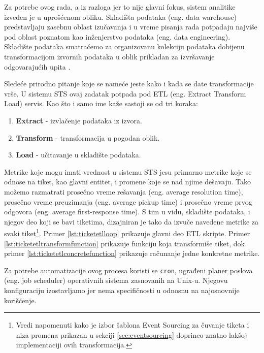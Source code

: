 \documentclass[12pt,oneside]{memoir}
\begin{document}
Za potrebe ovog rada, a iz razloga jer to nije glavni fokus, sistem analitike izveden je u uprošćenom obliku. Skladišta podataka (eng. data warehouse) predstavljaju zasebnu oblast izučavanja i u vreme pisanja rada potpadaju najviše pod oblast poznatom kao inženjerstvo podataka (eng. data engineering). Skladište podataka smatraćemo za organizovanu kolekciju podataka dobijenu transformacijom izvornih podataka u oblik prikladan za izvršavanje odgovarajućih upita \cite{dataanalytics}.

Sledeće prirodno pitanje koje se nameće jeste kako i kada se date transformacije vrše. U sistemu STS ovaj zadatak potpada pod ETL (eng. Extract Transform Load) servis. Kao što i samo ime kaže sastoji se od tri koraka:
\begin{enumerate}
    \item \textbf{Extract} - izvlačenje podataka iz izvora.
    \item \textbf{Transform} - transformacija u pogodan oblik.
    \item \textbf{Load} - učitavanje u skladište podataka.
\end{enumerate}

Metrike koje mogu imati vrednost u sistemu STS jesu primarno metrike koje se odnose na tiket, kao glavni entitet, i promene koje se nad njime dešavaju. Tako možemo razmatrati prosečno vreme rešavanja (eng. average resolution time), prosečno vreme preuzimanja (eng. average pickup time) i prosečno vreme prvog odgovora (eng. average first-response time). S tim u vidu, skladište podataka, i njegov deo koji se bavi tiketima, dizajniran je tako da izvuče navedene metrike za svaki tiket\footnote{Vredi napomenuti kako je izbor šablona Event Sourcing za čuvanje tiketa i niza promena prikazan u sekciji \ref{sec:eventsourcing} doprineo znatno lakšoj implementaciji ovih transformacija.}. Primer \ref{lst:ticketetlloop} prikazuje glavni deo ETL skripte. Primer \ref{lst:ticketetltransformfunction} prikazuje funkciju koja transformiše tiket, dok primer \ref{lst:ticketetlconcretefunction} prikazuje računanje jedne konkretne metrike.

Za potrebe automatizacije ovog procesa koristi se \verb|cron|, ugrađeni planer poslova (eng. job scheduler) operativnih sistema zasnovanih na Unix-u. Njegovu konfiguraciju izostavljamo jer nema specifičnosti u odnosnu na najosnovnije korišćenje.
\end{document}
